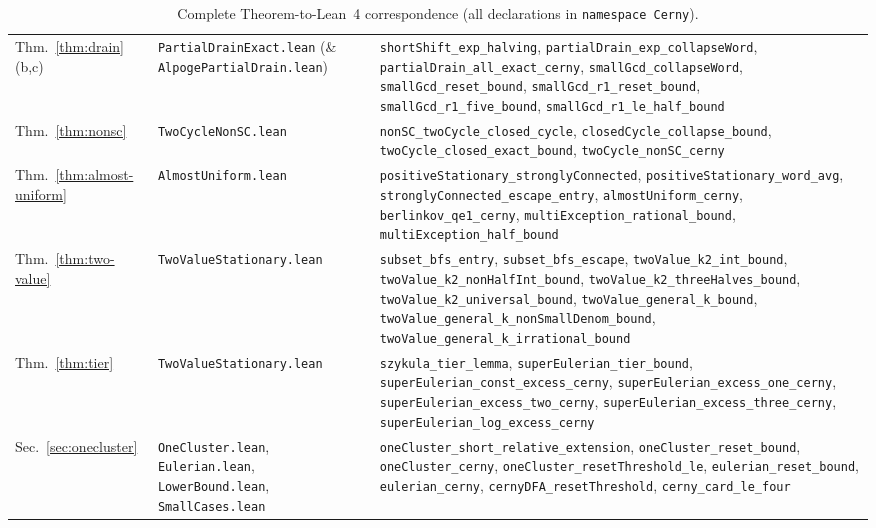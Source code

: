 \documentclass[11pt,a4paper]{article}
\theoremstyle{definition}
\theoremstyle{remark}
\newcommand{\us}{\_\allowbreak}
\begin{document}
\begin{table}[tbp]
\begin{tabular}{@{} >{\raggedright\arraybackslash}p{2.2cm} >{\raggedright\arraybackslash}p{3.6cm} >{\raggedright\arraybackslash}p{9.1cm} @{}}
Thm.~\ref{thm:drain}(b,c) & \texttt{PartialDrainExact.lean} (\& \texttt{AlpogePartialDrain.lean}) & \texttt{shortShift\us exp\us halving}, \texttt{partialDrain\us exp\us collapseWord}, \texttt{partialDrain\us all\us exact\us cerny}, \texttt{smallGcd\us collapseWord}, \texttt{smallGcd\us reset\us bound}, \texttt{smallGcd\us r1\us reset\us bound}, \texttt{smallGcd\us r1\us five\us bound}, \texttt{smallGcd\us r1\us le\us half\us bound} \\
Thm.~\ref{thm:nonsc} & \texttt{TwoCycleNonSC.lean} & \texttt{nonSC\us twoCycle\us closed\us cycle}, \texttt{closedCycle\us collapse\us bound}, \texttt{twoCycle\us closed\us exact\us bound}, \texttt{twoCycle\us nonSC\us cerny} \\
Thm.~\ref{thm:almost-uniform} & \texttt{AlmostUniform.lean} & \texttt{positiveStationary\us stronglyConnected}, \texttt{positiveStationary\us word\us avg}, \texttt{stronglyConnected\us escape\us entry}, \texttt{almostUniform\us cerny}, \texttt{berlinkov\us qe1\us cerny}, \texttt{multiException\us rational\us bound}, \texttt{multiException\us half\us bound} \\
Thm.~\ref{thm:two-value} & \texttt{TwoValueStationary.lean} & \texttt{subset\us bfs\us entry}, \texttt{subset\us bfs\us escape}, \texttt{twoValue\us k2\us int\us bound}, \texttt{twoValue\us k2\us nonHalfInt\us bound}, \texttt{twoValue\us k2\us threeHalves\us bound}, \texttt{twoValue\us k2\us universal\us bound}, \texttt{twoValue\us general\us k\us bound}, \texttt{twoValue\us general\us k\us nonSmallDenom\us bound}, \texttt{twoValue\us general\us k\us irrational\us bound} \\
Thm.~\ref{thm:tier} & \texttt{TwoValueStationary.lean} & \texttt{szykula\us tier\us lemma}, \texttt{superEulerian\us tier\us bound}, \texttt{superEulerian\us const\us excess\us cerny}, \texttt{superEulerian\us excess\us one\us cerny}, \texttt{superEulerian\us excess\us two\us cerny}, \texttt{superEulerian\us excess\us three\us cerny}, \texttt{superEulerian\us log\us excess\us cerny} \\
Sec.~\ref{sec:onecluster} & \texttt{OneCluster.lean}, \texttt{Eulerian.lean}, \texttt{LowerBound.lean}, \texttt{SmallCases.lean} & \texttt{oneCluster\us short\us relative\us extension}, \texttt{oneCluster\us reset\us bound}, \texttt{oneCluster\us cerny}, \texttt{oneCluster\us resetThreshold\us le}, \texttt{eulerian\us reset\us bound}, \texttt{eulerian\us cerny}, \texttt{cernyDFA\us resetThreshold}, \texttt{cerny\us card\us le\us four} \\
\bottomrule
\end{tabular}
\caption{Complete Theorem-to-Lean~4 correspondence (all declarations in \texttt{namespace Cerny}).}
\label{tab:correspondence}
\end{table}
\end{document}
